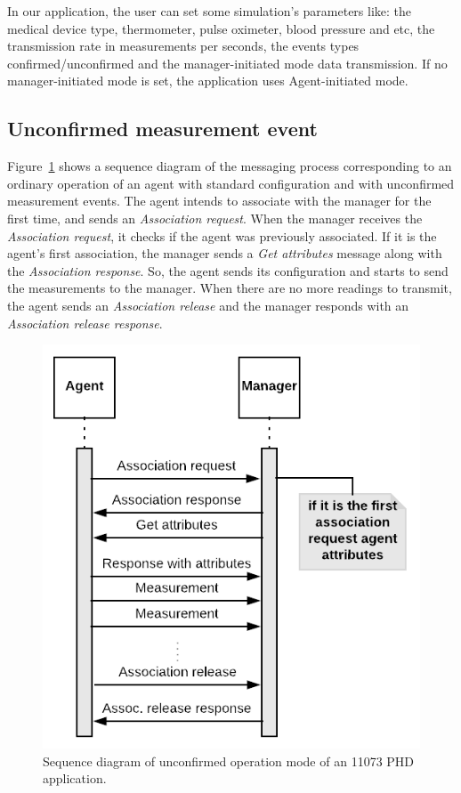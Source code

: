 In our application, the user can set some simulation's parameters like: the medical device type, thermometer, pulse oximeter, blood pressure and etc, the transmission rate in measurements per seconds, the events types confirmed/unconfirmed and the manager-initiated mode data transmission. If no manager-initiated mode is set, the application uses Agent-initiated mode.

\subsection{Unconfirmed measurement event}\label{sec:UnconfirmedMeasurementEvent}

Figure~\ref{fig:unconfirmedMode} shows a sequence diagram of the messaging process corresponding to an ordinary operation of an agent with standard configuration and with unconfirmed measurement events. The agent intends to associate with the manager for the first time, and sends an \textit{Association request}. When the manager receives the \textit{Association request}, it checks if the agent was previously associated. If it is the agent's first association, the manager sends a \textit{Get attributes} message along with the \textit{Association response}. So, the agent sends its configuration and starts to send the measurements to the manager. When there are no more readings to transmit, the agent sends an \textit{Association release} and the manager responds with an \textit{Association release response}.

\begin{figure}[htbp]
\centerline{\includegraphics[scale=0.35]{figures/unconfirmed.png}}
\caption{Sequence diagram of unconfirmed operation mode of an 11073 PHD application.}
\label{fig:unconfirmedMode}
\end{figure}

